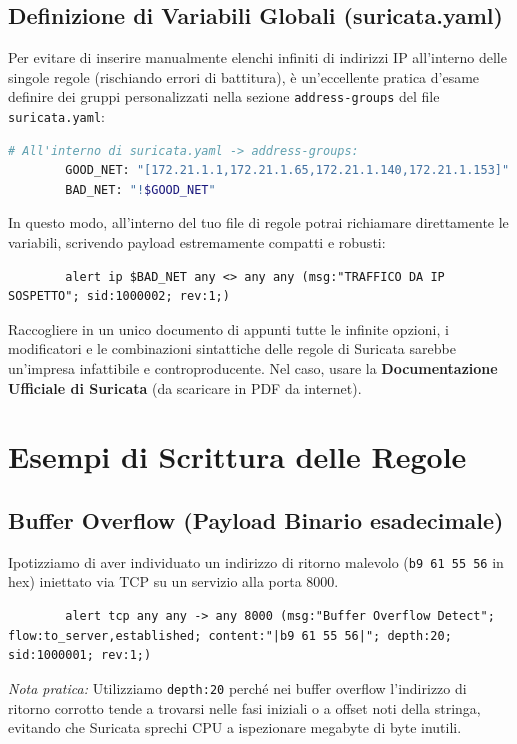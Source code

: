 \documentclass[12pt,a4paper]{report}
\begin{document}
	\subsection{Definizione di Variabili Globali (suricata.yaml)}
	Per evitare di inserire manualmente elenchi infiniti di indirizzi IP all'interno delle singole regole (rischiando errori di battitura), è un'eccellente pratica d'esame definire dei gruppi personalizzati nella sezione \texttt{address-groups} del file \texttt{suricata.yaml}:
	\begin{lstlisting}[language=bash]
		# All'interno di suricata.yaml -> address-groups:
		GOOD_NET: "[172.21.1.1,172.21.1.65,172.21.1.140,172.21.1.153]"
		BAD_NET: "!$GOOD_NET"
	\end{lstlisting}
	In questo modo, all'interno del tuo file di regole potrai richiamare direttamente le variabili, scrivendo payload estremamente compatti e robusti:
	\begin{lstlisting}
		alert ip $BAD_NET any <> any any (msg:"TRAFFICO DA IP SOSPETTO"; sid:1000002; rev:1;)
	\end{lstlisting}
	
\begin{nota}
	Raccogliere in un unico documento di appunti tutte le infinite opzioni, i modificatori e le combinazioni sintattiche delle regole di Suricata sarebbe un'impresa infattibile e controproducente. Nel caso, usare la \textbf{Documentazione Ufficiale di Suricata} (da scaricare in PDF da internet). 
\end{nota}
	
	\section{Esempi di Scrittura delle Regole}
	
	\subsection{Buffer Overflow (Payload Binario esadecimale)}
	Ipotizziamo di aver individuato un indirizzo di ritorno malevolo (\texttt{b9 61 55 56} in hex) iniettato via TCP su un servizio alla porta 8000.
	
	\begin{lstlisting}
		alert tcp any any -> any 8000 (msg:"Buffer Overflow Detect"; flow:to_server,established; content:"|b9 61 55 56|"; depth:20; sid:1000001; rev:1;)
	\end{lstlisting}
	\textit{Nota pratica:} Utilizziamo \texttt{depth:20} perché nei buffer overflow l'indirizzo di ritorno corrotto tende a trovarsi nelle fasi iniziali o a offset noti della stringa, evitando che Suricata sprechi CPU a ispezionare megabyte di byte inutili.
	
\end{document}
